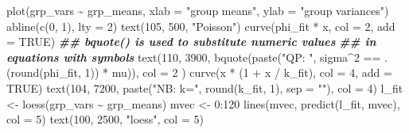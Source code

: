 \documentclass[
  12pt,
]{book}
\newenvironment{Shaded}{\begin{snugshade}}{\end{snugshade}}
\newcommand{\AttributeTok}[1]{\textcolor[rgb]{0.77,0.63,0.00}{#1}}
\newcommand{\ConstantTok}[1]{\textcolor[rgb]{0.00,0.00,0.00}{#1}}
\newcommand{\DecValTok}[1]{\textcolor[rgb]{0.00,0.00,0.81}{#1}}
\newcommand{\DocumentationTok}[1]{\textcolor[rgb]{0.56,0.35,0.01}{\textbf{\textit{#1}}}}
\newcommand{\FunctionTok}[1]{\textcolor[rgb]{0.00,0.00,0.00}{#1}}
\newcommand{\NormalTok}[1]{#1}
\newcommand{\OtherTok}[1]{\textcolor[rgb]{0.56,0.35,0.01}{#1}}
\newcommand{\SpecialCharTok}[1]{\textcolor[rgb]{0.00,0.00,0.00}{#1}}
\newcommand{\StringTok}[1]{\textcolor[rgb]{0.31,0.60,0.02}{#1}}
\begin{document}
\begin{Shaded}
\begin{Highlighting}[]
\FunctionTok{plot}\NormalTok{(grp\_vars }\SpecialCharTok{\textasciitilde{}}\NormalTok{ grp\_means, }\AttributeTok{xlab =} \StringTok{"group means"}\NormalTok{, }\AttributeTok{ylab =} \StringTok{"group variances"}\NormalTok{)}
\FunctionTok{abline}\NormalTok{(}\FunctionTok{c}\NormalTok{(}\DecValTok{0}\NormalTok{, }\DecValTok{1}\NormalTok{), }\AttributeTok{lty =} \DecValTok{2}\NormalTok{)}
\FunctionTok{text}\NormalTok{(}\DecValTok{105}\NormalTok{, }\DecValTok{500}\NormalTok{, }\StringTok{"Poisson"}\NormalTok{)}
\FunctionTok{curve}\NormalTok{(phi\_fit }\SpecialCharTok{*}\NormalTok{ x, }\AttributeTok{col =} \DecValTok{2}\NormalTok{, }\AttributeTok{add =} \ConstantTok{TRUE}\NormalTok{)}
\DocumentationTok{\#\# bquote() is used to substitute numeric values}
\DocumentationTok{\#\# in equations with symbols}
\FunctionTok{text}\NormalTok{(}\DecValTok{110}\NormalTok{, }\DecValTok{3900}\NormalTok{,}
  \FunctionTok{bquote}\NormalTok{(}\FunctionTok{paste}\NormalTok{(}\StringTok{"QP: "}\NormalTok{, sigma}\SpecialCharTok{\^{}}\DecValTok{2} \SpecialCharTok{==}\NormalTok{ .(}\FunctionTok{round}\NormalTok{(phi\_fit, }\DecValTok{1}\NormalTok{)) }\SpecialCharTok{*}\NormalTok{ mu)),}
  \AttributeTok{col =} \DecValTok{2}
\NormalTok{)}
\FunctionTok{curve}\NormalTok{(x }\SpecialCharTok{*}\NormalTok{ (}\DecValTok{1} \SpecialCharTok{+}\NormalTok{ x }\SpecialCharTok{/}\NormalTok{ k\_fit), }\AttributeTok{col =} \DecValTok{4}\NormalTok{, }\AttributeTok{add =} \ConstantTok{TRUE}\NormalTok{)}
\FunctionTok{text}\NormalTok{(}\DecValTok{104}\NormalTok{, }\DecValTok{7200}\NormalTok{, }\FunctionTok{paste}\NormalTok{(}\StringTok{"NB: k="}\NormalTok{, }\FunctionTok{round}\NormalTok{(k\_fit, }\DecValTok{1}\NormalTok{), }\AttributeTok{sep =} \StringTok{""}\NormalTok{), }\AttributeTok{col =} \DecValTok{4}\NormalTok{)}
\NormalTok{l\_fit }\OtherTok{\textless{}{-}} \FunctionTok{loess}\NormalTok{(grp\_vars }\SpecialCharTok{\textasciitilde{}}\NormalTok{ grp\_means)}
\NormalTok{mvec }\OtherTok{\textless{}{-}} \DecValTok{0}\SpecialCharTok{:}\DecValTok{120}
\FunctionTok{lines}\NormalTok{(mvec, }\FunctionTok{predict}\NormalTok{(l\_fit, mvec), }\AttributeTok{col =} \DecValTok{5}\NormalTok{)}
\FunctionTok{text}\NormalTok{(}\DecValTok{100}\NormalTok{, }\DecValTok{2500}\NormalTok{, }\StringTok{"loess"}\NormalTok{, }\AttributeTok{col =} \DecValTok{5}\NormalTok{)}
\end{Highlighting}
\end{Shaded}
\end{document}
